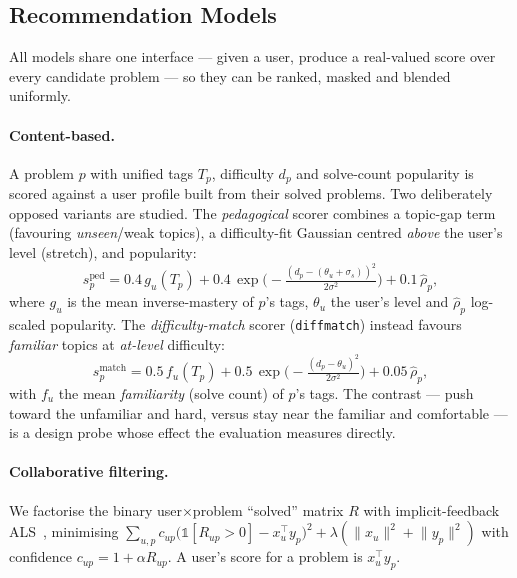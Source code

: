 \documentclass[12pt,a4paper]{article}
\begin{document}
\subsection{Recommendation Models}
\label{sec:design-models}
All models share one interface --- given a user, produce a real-valued score over every
candidate problem --- so they can be ranked, masked and blended uniformly.

\paragraph{Content-based.} A problem $p$ with unified tags $T_p$, difficulty $d_p$ and
solve-count popularity is scored against a user profile built from their solved
problems. Two deliberately opposed variants are studied. The \emph{pedagogical} scorer
combines a topic-gap term (favouring \emph{unseen}/weak topics), a difficulty-fit
Gaussian centred \emph{above} the user's level (stretch), and popularity:
\begin{equation}
s^{\text{ped}}_p = 0.4\,g_u(T_p) + 0.4\,\exp\!\Big(\!-\tfrac{(d_p-(\theta_u+\sigma_s))^2}{2\sigma^2}\Big) + 0.1\,\hat{\rho}_p ,
\end{equation}
where $g_u$ is the mean inverse-mastery of $p$'s tags, $\theta_u$ the user's level and
$\hat\rho_p$ log-scaled popularity. The \emph{difficulty-match} scorer
(\texttt{diffmatch}) instead favours \emph{familiar} topics at \emph{at-level}
difficulty:
\begin{equation}
s^{\text{match}}_p = 0.5\,f_u(T_p) + 0.5\,\exp\!\Big(\!-\tfrac{(d_p-\theta_u)^2}{2\sigma^2}\Big) + 0.05\,\hat{\rho}_p ,
\end{equation}
with $f_u$ the mean \emph{familiarity} (solve count) of $p$'s tags. The contrast --- push
toward the unfamiliar and hard, versus stay near the familiar and comfortable --- is a
design probe whose effect the evaluation measures directly.

\paragraph{Collaborative filtering.} We factorise the binary user$\times$problem ``solved''
matrix $R$ with implicit-feedback ALS~\cite{hu2008}, minimising
$\sum_{u,p} c_{up}\big(\mathbb{1}[R_{up}{>}0]-x_u^\top y_p\big)^2 + \lambda(\lVert x_u\rVert^2+\lVert y_p\rVert^2)$
with confidence $c_{up}=1+\alpha R_{up}$. A user's score for a problem is $x_u^\top y_p$.
\end{document}

